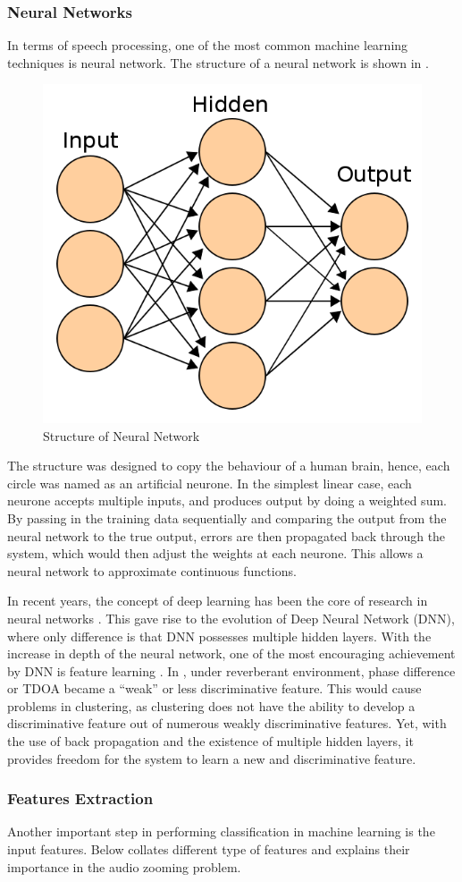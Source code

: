 \documentclass[a4paper,twoside,12pt,hidelinks]{article}
\begin{document}
\subsubsection{Neural Networks}
In terms of speech processing, one of the most common machine learning techniques is neural network. The structure of a neural network is shown in .

\begin{figure}[H]
\centering
\includegraphics[width=0.35\linewidth]{neural_network}
\caption{Structure of Neural Network}
\label{fig:neuralnet}
\end{figure}

The structure was designed to copy the behaviour of a human brain, hence, each circle was named as an artificial neurone. In the simplest linear case, each neurone accepts multiple inputs, and produces output by doing a weighted sum. By passing in the training data sequentially and comparing the output from the neural network to the true output, errors are then propagated back through the system, which would then adjust the weights at each neurone. This allows a neural network to approximate continuous functions.

In recent years, the concept of deep learning has been the core of research in neural networks \cite{Schmidhuber2015DeepOverview}. This gave rise to the evolution of Deep Neural Network (DNN), where only difference is that DNN possesses multiple hidden layers. With the increase in depth of the neural network, one of the most encouraging achievement by DNN is feature learning \cite{yu2013feature}. In , under reverberant environment, phase difference or TDOA became a ``weak'' or less discriminative feature. This would cause problems in clustering, as clustering does not have the ability to develop a discriminative feature out of numerous weakly discriminative features. Yet, with the use of back propagation and the existence of multiple hidden layers, it provides freedom for the system to learn a new and discriminative feature. 

\subsubsection{Features Extraction}
Another important step in performing classification in machine learning is the input features. Below collates different type of features and explains their importance in the audio zooming problem.
\end{document}
